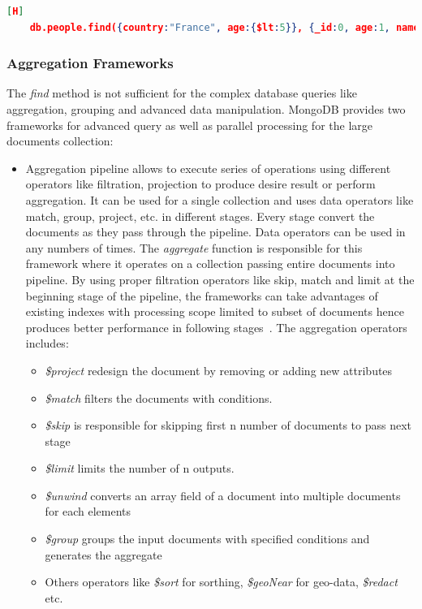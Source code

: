 \begin{lstlisting}[language=JSON,caption=\textit{find()} with query and project, label=mongodb-find-real][H]
    db.people.find({country:"France", age:{$lt:5}}, {_id:0, age:1, name:1}) 
\end{lstlisting}
	

\subsubsection{Aggregation Frameworks}
 The \textit{find} method is not sufficient for the complex database queries like aggregation, grouping  and advanced data manipulation. MongoDB provides two frameworks for  advanced query as well as parallel processing for the large documents collection:
 \begin{itemize}
		\item{ Aggregation pipeline} allows to execute series of operations using different operators like filtration, projection to produce desire result or perform aggregation.  It can be used for a single collection and uses  data operators like match, group, project, etc. in different stages. Every stage convert the documents as they pass through the pipeline. Data operators can be used  in any numbers of times.  The \textit{aggregate} function is responsible for this framework where it operates on a collection passing  entire documents into pipeline. By using proper filtration operators like  skip, match and limit at the beginning  stage of the pipeline,  the frameworks can take advantages of existing indexes with processing scope limited to subset of documents  hence produces better performance in following stages~\cite{mongodbaggregation}.  The aggregation operators includes:
		 \begin{itemize}
    		    \item \textit{\$project}  redesign the document by removing or adding new attributes
                \item \textit{\$match}  filters the documents with conditions.
                \item \textit{\$skip}  is responsible for skipping first n number of documents to pass next stage
                \item \textit{\$limit} limits the number of n outputs.
                \item \textit{\$unwind} converts an array field of a document into multiple documents for each elements
                \item \textit{\$group} groups the input documents with specified conditions and generates the aggregate
                \item Others operators like  \textit{\$sort} for sorthing, \textit{\$geoNear} for geo-data, \textit{\$redact} etc.
		   \end{itemize}
		   

\end{itemize}
